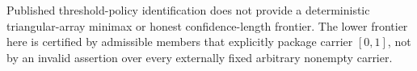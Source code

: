 Published threshold-policy identification does not provide a deterministic triangular-array minimax or honest confidence-length frontier. The lower frontier here is certified by admissible members that explicitly package carrier \([0,1]\), not by an invalid assertion over every externally fixed arbitrary nonempty carrier.
